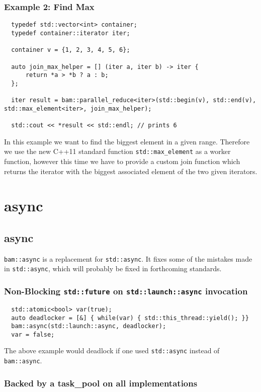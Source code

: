 \documentclass[11pt, a4paper]{article}
\begin{document}
\subsubsection{Example 2: Find Max}
\begin{lstlisting}
  typedef std::vector<int> container;
  typedef container::iterator iter;

  container v = {1, 2, 3, 4, 5, 6};

  auto join_max_helper = [] (iter a, iter b) -> iter {
      return *a > *b ? a : b;
  };

  iter result = bam::parallel_reduce<iter>(std::begin(v), std::end(v), std::max_element<iter>, join_max_helper);

  std::cout << *result << std::endl; // prints 6
\end{lstlisting}

In this example we want to find the biggest element in a given range. Therefore we use the new C++11 standard function \texttt{std::max\_element} as a worker function, however this time we have to provide a custom join function which returns the iterator with the biggest associated element of the two given iterators.

\section{async}
\subsection{async}
\texttt{bam::async} is a replacement for \texttt{std::async}. It fixes some of the mistakes made in \texttt{std::async}, which will probably be fixed in forthcoming standards. 

\subsubsection{ Non-Blocking \texttt{std::future} on \texttt{std::launch::async} invocation }

\begin{lstlisting}
  std::atomic<bool> var(true);
  auto deadlocker = [&] { while(var) { std::this_thread::yield(); }}
  bam::async(std::launch::async, deadlocker);
  var = false;
\end{lstlisting}

The above example would deadlock if one used \texttt{std::async} instead of \texttt{bam::async}. 

\subsubsection{ Backed by a task\_pool on all implementations}
\end{document}

